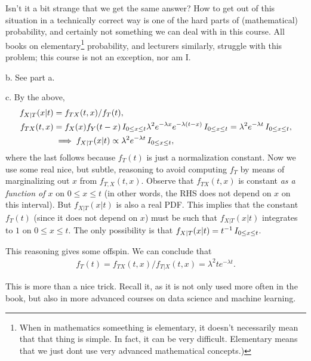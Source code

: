 \begin{exercise}[BH.7.10]
\begin{solution}
Isn't it a bit strange that we get the same answer?
How to get out of this situation in a technically correct way is one of the hard parts of (mathematical) probability, and certainly not something we can deal with  in this course.
All books on elementary\footnote{When  in mathematics someething is elementary, it doesn't necessarily mean that that thing is simple. In fact, it can be very difficult.  Elementary means that we just dont use very advanced mathematical concepts.)} probability, and lecturers similarly, struggle with this problem; this course is not an exception, nor am I.

b.  See  part a.

c. By the above,
\begin{align*}
  f_{X|T}(x|t) &= f_{TX}(t,x)/f_T(t), \\
f_{TX}(t,x)  &=  f_X(x)f_Y(t-x) \,I_{0\leq x \leq t} \lambda^2 e^{-\lambda x} e^{-\lambda(t-x)} \,I_{0\leq x\leq t} = \lambda^2e^{-\lambda t} \,I_{0\leq x\leq t},\\
  &\implies  f_{X|T}(x|t) \propto \lambda^2e^{-\lambda t} \,I_{0\leq x\leq t} ,
\end{align*}
where the last follows because $f_T(t)$ is just a normalization constant.
Now we use some real nice, but subtle, reasoning to avoid computing $f_T$ by means of marginalizing out $x$ from $f_{T,X}(t, x)$.  Observe that $f_{TX}(t, x)$ is constant \emph{as a function of $x$} on $0\leq x \leq t$ (in other words, the RHS does not depend on $x$ on this interval). But $f_{X|T}(x|t)$  is also a real PDF. This implies  that the constant $f_T(t)$ (since it does not depend on $x$) must be  such that  $f_{X|T}(x|t)$ integrates to $1$ on $0\leq x \leq t$. The only possibility is that $f_{X|T}(x|t) = t^{-1}\,I_{0\leq x \leq t}$.

This reasoning gives some  offspin.  We can conclude that
\begin{align*}
  f_T(t) = f_{TX}(t, x)/f_{T|X}(t,x) = \lambda^2 t e^{-\lambda t}.
\end{align*}

This is more than a nice trick. Recall it, as it is not only used more often in the book, but also in more advanced courses on data science and machine learning.
\end{solution}
\end{exercise}


